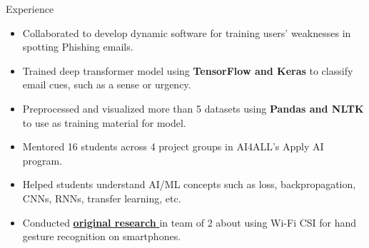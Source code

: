 \documentclass{resume} %
\begin{document}
\begin{workSection}{Experience}
    \experienceItem[
        company=UTEP,
        location=El Paso{,} TX,
        position=Volunteer Researcher,
        duration=August 2023 {-} Present
    ]
    \begin{itemize}
        \vspace{-0.5em}
        \itemsep -6pt {}
        \item Collaborated to develop dynamic software for training users' weaknesses in spotting Phishing emails.
        \item Trained deep transformer model using \textbf{TensorFlow and Keras} to classify email cues, such as a sense or urgency.
        \item Preprocessed and visualized more than 5 datasets using \textbf{Pandas and NLTK} to use as training material for model.
    \end{itemize}
    \experienceItem[
        company=AI4ALL,
        location=Remote,
        position=Student Coordinator,
        duration=August 2023 {-} Present
    ]
    \begin{itemize}
        \vspace{-0.5em}
        \itemsep -6pt {}
        \item Mentored 16 students across 4 project groups in AI4ALL's Apply AI program.
        \item Helped students understand AI/ML concepts such as loss, backpropagation, CNNs, RNNs, transfer learning, etc.
    \end{itemize}
    \experienceItem[
    company=Temple University,
    location=Philadelphia{,} PA,
    position=Undergraduate Researcher,
    duration=June {-} July 2023
    ]
    \begin{itemize}
        \vspace{-0.5em}
        \itemsep -6pt {}
        \item Conducted \href{https://drive.google.com/file/d/1HG4S5iSNb0nX2yN3LfSsRilemFDamnaN/view?usp=sharing}{\textbf{original research} \faExternalLink} in team of 2 about using Wi-Fi CSI for hand gesture recognition on smartphones.

\end{itemize}
\end{workSection}
\end{document}

